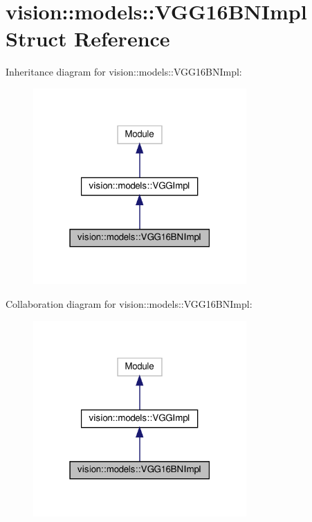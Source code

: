 \hypertarget{structvision_1_1models_1_1VGG16BNImpl}{}\section{vision\+:\+:models\+:\+:V\+G\+G16\+B\+N\+Impl Struct Reference}
\label{structvision_1_1models_1_1VGG16BNImpl}


Inheritance diagram for vision\+:\+:models\+:\+:V\+G\+G16\+B\+N\+Impl\+:
\nopagebreak
\begin{figure}[H]
\begin{center}
\leavevmode
\includegraphics[width=231pt]{structvision_1_1models_1_1VGG16BNImpl__inherit__graph}
\end{center}
\end{figure}


Collaboration diagram for vision\+:\+:models\+:\+:V\+G\+G16\+B\+N\+Impl\+:
\nopagebreak
\begin{figure}[H]
\begin{center}
\leavevmode
\includegraphics[width=231pt]{structvision_1_1models_1_1VGG16BNImpl__coll__graph}
\end{center}
\end{figure}
